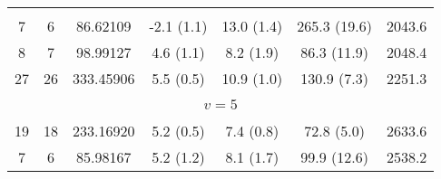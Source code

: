 \begin{table*}[htp]
\begin{tabular}{ccccccc}
\vspace{-0.75em}\\
 7 & 6 & 86.62109 & -2.1 (1.1) & 13.0 (1.4) & 265.3 (19.6) & 2043.6 \\
 8 & 7 & 98.99127 & 4.6 (1.1) & 8.2 (1.9) & 86.3 (11.9) & 2048.4 \\
 27 & 26 & 333.45906 & 5.5 (0.5) & 10.9 (1.0) & 130.9 (7.3) & 2251.3 \\
&\vspace{-0.75em}\\
\multicolumn{7}{c}{$v = 5$} \\
\vspace{-0.75em}\\
 19 & 18 & 233.16920 & 5.2 (0.5) & 7.4 (0.8) & 72.8 (5.0) & 2633.6 \\
 7 & 6 & 85.98167 & 5.2 (1.2) & 8.1 (1.7) & 99.9 (12.6) & 2538.2 \\
\hline
\end{tabular}

\par 
\end{table*}
